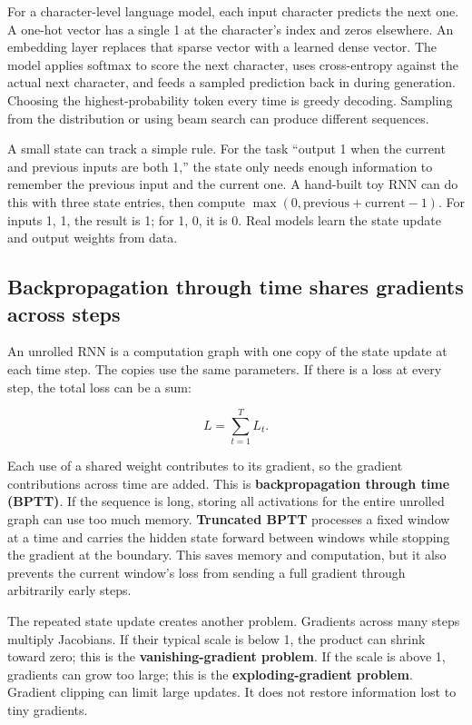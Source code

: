 For a character-level language model, each input character predicts the next one. A one-hot vector has a single 1 at the character's index and zeros elsewhere. An embedding layer replaces that sparse vector with a learned dense vector. The model applies softmax to score the next character, uses cross-entropy against the actual next character, and feeds a sampled prediction back in during generation. Choosing the highest-probability token every time is greedy decoding. Sampling from the distribution or using beam search can produce different sequences.

A small state can track a simple rule. For the task ``output 1 when the current and previous inputs are both 1,'' the state only needs enough information to remember the previous input and the current one. A hand-built toy RNN can do this with three state entries, then compute \(\max(0,\text{previous}+\text{current}-1)\). For inputs 1, 1, the result is 1; for 1, 0, it is 0. Real models learn the state update and output weights from data.

\subsection{Backpropagation through time shares gradients across steps}\label{04-visual-computing-ii-ch031-backpropagation-through-time-shares-gradients-across-steps}

\hypertarget{04-visual-computing-ii-ch031-backpropagation-through-time-shares-gradients-across-steps}{}

An unrolled RNN is a computation graph with one copy of the state update at each time step. The copies use the same parameters. If there is a loss at every step, the total loss can be a sum:

\[L=\sum_{t=1}^{T} L_t.\]

Each use of a shared weight contributes to its gradient, so the gradient contributions across time are added. This is \textbf{backpropagation through time (BPTT)}. If the sequence is long, storing all activations for the entire unrolled graph can use too much memory. \textbf{Truncated BPTT} processes a fixed window at a time and carries the hidden state forward between windows while stopping the gradient at the boundary. This saves memory and computation, but it also prevents the current window's loss from sending a full gradient through arbitrarily early steps.

The repeated state update creates another problem. Gradients across many steps multiply Jacobians. If their typical scale is below 1, the product can shrink toward zero; this is the \textbf{vanishing-gradient problem}. If the scale is above 1, gradients can grow too large; this is the \textbf{exploding-gradient problem}. Gradient clipping can limit large updates. It does not restore information lost to tiny gradients.

